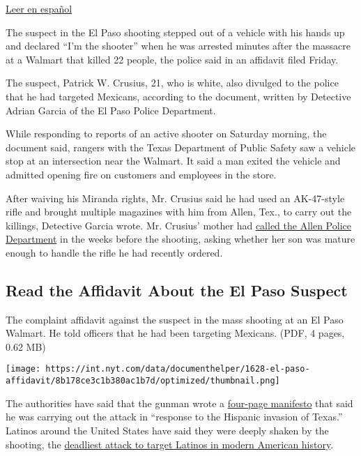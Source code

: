 \href{https://www.nytimes.com/es/2019/08/09/espanol/mundo/el-paso-sospechoso-mexicanos.html}{Leer
en español}

The suspect in the El Paso shooting stepped out of a vehicle with his
hands up and declared ``I'm the shooter'' when he was arrested minutes
after the massacre at a Walmart that killed 22 people, the police said
in an affidavit filed Friday.

The suspect, Patrick W. Crusius, 21, who is white, also divulged to the
police that he had targeted Mexicans, according to the document, written
by Detective Adrian Garcia of the El Paso Police Department.

While responding to reports of an active shooter on Saturday morning,
the document said, rangers with the Texas Department of Public Safety
saw a vehicle stop at an intersection near the Walmart. It said a man
exited the vehicle and admitted opening fire on customers and employees
in the store.

After waiving his Miranda rights, Mr. Crusius said he had used an
AK-47-style rifle and brought multiple magazines with him from Allen,
Tex., to carry out the killings, Detective Garcia wrote. Mr. Crusius'
mother had
\href{https://www.nytimes.com/2019/08/08/us/el-paso-suspect.html}{called
the Allen Police Department} in the weeks before the shooting, asking
whether her son was mature enough to handle the rifle he had recently
ordered.

\hypertarget{read-the-affidavit-about-the-el-paso-suspect}{%
\subsection{Read the Affidavit About the El Paso
Suspect}\label{read-the-affidavit-about-the-el-paso-suspect}}

The complaint affidavit against the suspect in the mass shooting at an
El Paso Walmart. He told officers that he had been targeting Mexicans.
(PDF, 4 pages, 0.62 MB)

\texttt{[image: https://int.nyt.com/data/documenthelper/1628-el-paso-affidavit/8b178ce3c1b380ac1b7d/optimized/thumbnail.png]}

The authorities have said that the gunman wrote a
\href{https://www.nytimes.com/2019/08/03/us/patrick-crusius-el-paso-shooter-manifesto.html}{four-page
manifesto} that said he was carrying out the attack in ``response to the
Hispanic invasion of Texas.'' Latinos around the United States have said
they were deeply shaken by the shooting, the
\href{https://www.nytimes.com/2019/08/04/us/el-paso-shooting-mexico-border.html}{deadliest
attack to target Latinos in modern American history}.

